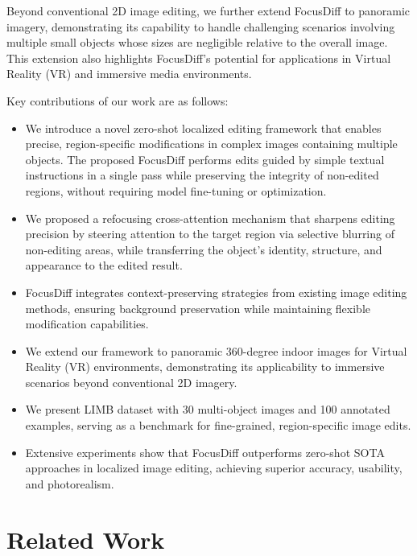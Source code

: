 \documentclass[runningheads]{llncs}
\begin{document}
Beyond conventional 2D image editing, we further extend FocusDiff to panoramic imagery, demonstrating its capability to handle challenging scenarios involving multiple small objects whose sizes are negligible relative to the overall image. This extension also highlights FocusDiff’s potential for applications in Virtual Reality (VR) and immersive media environments.

Key contributions of our work are as follows:  
\begin{itemize}
    \item We introduce a novel zero-shot localized editing framework that enables precise, region-specific modifications in complex images containing multiple objects. The proposed FocusDiff performs edits guided by simple textual instructions in a single pass while preserving the integrity of non-edited regions, without requiring model fine-tuning or optimization. 

    \item We proposed a refocusing cross-attention mechanism that sharpens editing precision by steering attention to the target region via selective blurring of non-editing areas, while transferring the object’s identity, structure, and appearance to the edited result.

    
    \item FocusDiff integrates context-preserving strategies from existing image editing methods, ensuring background preservation while maintaining flexible modification capabilities.

    \item We extend our framework to panoramic 360-degree indoor images for Virtual Reality (VR) environments, demonstrating its applicability to immersive scenarios beyond conventional 2D imagery. 

    \item We present LIMB dataset with 30 multi-object images and 100 annotated examples, serving as a benchmark for fine-grained, region-specific image edits.
    
    \item Extensive experiments show that FocusDiff outperforms zero-shot SOTA approaches in localized image editing, achieving superior accuracy, usability, and photorealism.  
\end{itemize}  



\section{Related Work}
\label{sec:related}
\end{document}
